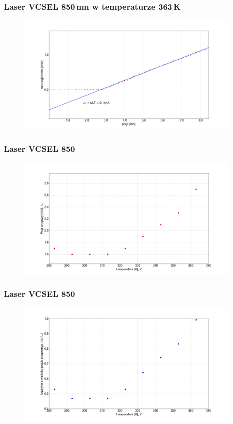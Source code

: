 \documentclass[xcolor={dvipsnames,table}]{beamer}
\begin{document}
\begin{frame}
\frametitle{Laser VCSEL 850\,nm w temperaturze 363\,K}
\center
\begin{figure}
   \includegraphics[width=1.10\textwidth,natwidth=69,natheight=87]{vcsel850/temp_90_fit.png}
\end{figure}
\end{frame}

\begin{frame}
\frametitle{Laser VCSEL 850}
\center
\begin{figure}
   \includegraphics[width=1.10\textwidth,natwidth=69,natheight=87]{vcsel850/plot_lin_i_th.png}
\end{figure}
\end{frame}

\begin{frame}
\frametitle{Laser VCSEL 850}
\center
\begin{figure}
   \includegraphics[width=1.10\textwidth,natwidth=69,natheight=87]{vcsel850/plot_log_i_th.png}
\end{figure}
\end{frame}
\end{document}
